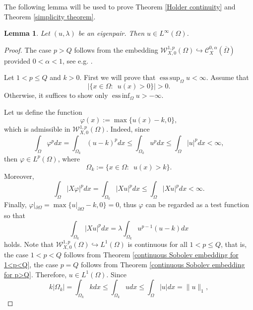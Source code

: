 \documentclass[a4paper,12pt,reqno]{amsart}
\numberwithin{equation}{section}
\theoremstyle{plain}
\newtheorem{lemma}[theorem]{Lemma}
\theoremstyle{definition}
\DeclareMathOperator*{\esssup}{ess\,sup}
\DeclareMathOperator*{\essinf}{ess\,inf}
\begin{document}
The following lemma will be used to prove Theorem \ref{Holder continuity} and Theorem \ref{simplicity theorem}.
\begin{lemma}\label{L infty boundedness}
Let $(u,\lambda)$ be an eigenpair. Then $u\in L^{\infty}(\Omega)$.
\end{lemma}
\begin{proof}
The case $p>Q$ follows from the  embedding $\mathcal{W}_{X,0}^{1, p}(\Omega)\hookrightarrow \mathcal{C}^{0, \alpha}_{X}(\overline{\Omega})$ provided $0<\alpha<1$, see e.g. \cite[Remark 1.1]{chen2024sharp}.

Let $1<p\leq Q$ and $k>0$. First we will prove that $\esssup_{\Omega}u<\infty$. Assume that 
$$\left|\{x\in\Omega:\enspace u(x)>0\}\right|>0.$$
Otherwise, it suffices to show only $\essinf_{\Omega}u>-\infty$.

Let us define the function
\begin{equation*}
\varphi(x):=\max \{u(x)-k, 0\},
\end{equation*}
which is admissible in $\mathcal{W}_{X,0}^{1, p}(\Omega)$. Indeed, since
\begin{equation*}
    \int_{\Omega}\varphi^{p}dx=\int_{\Omega_{k}}(u-k)^{p}dx\leq \int_{\Omega_{k}}u^{p}dx\leq \int_{\Omega}|u|^{p}dx<\infty,
\end{equation*} 
then $\varphi\in L^{p}(\Omega)$, where
\begin{equation*}
\Omega_{k}:=\{x \in \Omega : \enspace u(x)>k\} .
\end{equation*}
Moreover, 
\begin{equation*}
\int_{\Omega}|X\varphi|^{p}dx=\int_{\Omega_{k}}|Xu|^{p}dx\leq \int_{\Omega}|Xu|^{p}dx<\infty.
\end{equation*}
Finally, $\varphi|_{\partial\Omega}=\max\{u|_{\partial\Omega}-k,0\}=0$, thus $\varphi$ can be regarded as a test function  so that
\begin{equation*}
\int_{\Omega_{k}}|X u|^{p} d x=\lambda \int_{\Omega_{k}}u^{p-1}(u-k) d x    
\end{equation*}
holds. Note that $\mathcal{W}_{X,0}^{1, p}(\Omega)\hookrightarrow L^{1}(\Omega)$ is continuous for all $1<p\leq Q$, that is, the case $1<p<Q$ follows from Theorem \ref{continuous Sobolev embedding for 1<p<Q}, the case $p=Q$ follows from Theorem \ref{continuous Sobolev embedding for p>Q}. Therefore, $u\in L^{1}(\Omega)$. Since
\begin{equation}\label{upper bound: some properties 0}
 k\left|\Omega_{k}\right|=   \int_{\Omega_{k}}kdx\leq \int_{\Omega_{k}} u dx\leq \int_{\Omega} |u| dx=\|u\|_{1},

\end{equation}
\end{proof}
\end{document}
